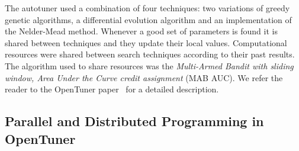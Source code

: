 The autotuner used a combination of four techniques: two variations of greedy
genetic algorithms, a differential evolution algorithm and an implementation of
the Nelder-Mead method.  Whenever a good set of parameters is found it is
shared between techniques and they update their local values. Computational
resources were shared between search techniques according to their past
results. The algorithm used to share resources was the \textit{Multi-Armed
Bandit with sliding window, Area Under the Curve credit assignment} (MAB AUC).
We refer the reader to the OpenTuner paper~\cite{ansel2014opentuner} for a
detailed description.

\subsection{Parallel and Distributed Programming in OpenTuner}
\label{sec:opentuner-parallel}

%
%
%
%
%
